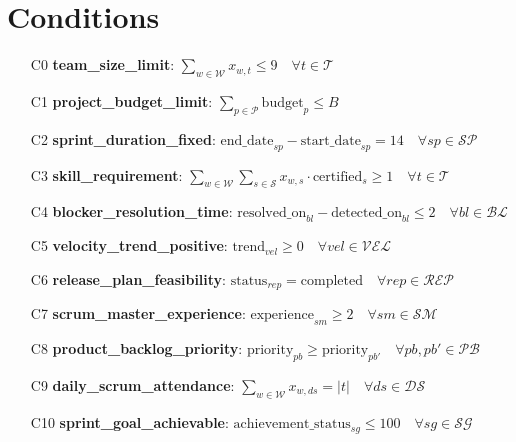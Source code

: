 \documentclass{article}
\begin{document}
\section{Conditions}
\begin{itemize}
    \item[C0] \textbf{team\_size\_limit}: $\sum_{w \in \mathcal{W}} x_{w,t} \leq 9 \quad \forall t \in \mathcal{T}$
    \item[C1] \textbf{project\_budget\_limit}: $\sum_{p \in \mathcal{P}} \text{budget}_p \leq B$
    \item[C2] \textbf{sprint\_duration\_fixed}: $\text{end\_date}_{sp} - \text{start\_date}_{sp} = 14 \quad \forall sp \in \mathcal{SP}$
    \item[C3] \textbf{skill\_requirement}: $\sum_{w \in \mathcal{W}} \sum_{s \in \mathcal{S}} x_{w,s} \cdot \text{certified}_s \geq 1 \quad \forall t \in \mathcal{T}$
    \item[C4] \textbf{blocker\_resolution\_time}: $\text{resolved\_on}_{bl} - \text{detected\_on}_{bl} \leq 2 \quad \forall bl \in \mathcal{BL}$
    \item[C5] \textbf{velocity\_trend\_positive}: $\text{trend}_{vel} \geq 0 \quad \forall vel \in \mathcal{VEL}$
    \item[C6] \textbf{release\_plan\_feasibility}: $\text{status}_{rep} = \text{completed} \quad \forall rep \in \mathcal{REP}$
    \item[C7] \textbf{scrum\_master\_experience}: $\text{experience}_{sm} \geq 2 \quad \forall sm \in \mathcal{SM}$
    \item[C8] \textbf{product\_backlog\_priority}: $\text{priority}_{pb} \geq \text{priority}_{pb'} \quad \forall pb, pb' \in \mathcal{PB}$
    \item[C9] \textbf{daily\_scrum\_attendance}: $\sum_{w \in \mathcal{W}} x_{w,ds} = |t| \quad \forall ds \in \mathcal{DS}$
    \item[C10] \textbf{sprint\_goal\_achievable}: $\text{achievement\_status}_{sg} \leq 100 \quad \forall sg \in \mathcal{SG}$
\end{itemize}
\end{document}
